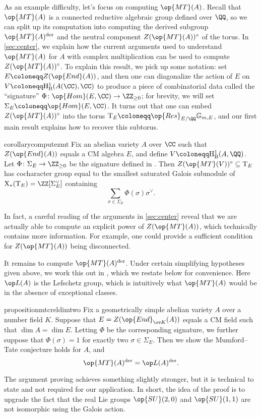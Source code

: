 \documentclass[openany]{book}
\begin{document}
As an example difficulty, let's focus on computing $\op{MT}(A)$. Recall that $\op{MT}(A)$ is a connected reductive algebraic group defined over $\QQ$, so we can split up its computation into computing the derived subgroup $\op{MT}(A)^{\mathrm{der}}$ and the neutral component $Z(\op{MT}(A))^\circ$ of the torus. In \cref{sec:center}, we explain how the current arguments used to understand $\op{MT}(A)$ for $A$ with complex multiplication can be used to compute $Z(\op{MT}(A))^\circ$. To explain this result, we pick up some notation: set $E\coloneqq Z(\op{End}(A))$, and then one can diagonalize the action of $E$ on $V\coloneqq\mathrm H^1_{\mathrm B}(A(\CC),\CC)$ to produce a piece of combinatorial data called the ``signature'' $\Phi\colon\op{Hom}(E,\CC)\to\ZZ_{\ge0}$; for brevity, we will set $\Sigma_E\coloneqq\op{Hom}(E,\CC)$. It turns out that one can embed $Z(\op{MT}(A))^\circ$ into the torus $\mathrm T_E\coloneqq\op{Res}_{E/\QQ}\mathbb G_{m,E}$, and our first main result explains how to recover this subtorus.
\begin{restatable*}{corollary}{computezmt} \label{cor:compute-z-mt}
	Fix an abelian variety $A$ over $\CC$ such that $Z(\op{End}(A))$ equals a CM algebra $E$, and define $V\coloneqq\mathrm H^1_{\mathrm B}(A,\QQ)$. Let $\Phi\colon\Sigma_E\to\ZZ_{\ge0}$ be the signature defined in . Then $Z(\op{MT}(V))^\circ\subseteq\mathrm T_E$ has cocharacter group equal to the smallest saturated Galois submodule of $\mathrm X_*(\mathrm T_E)=\ZZ[\Sigma_E^\lor]$ containing
	\[\sum_{\sigma\in\Sigma_E}\Phi(\sigma)\sigma^\lor.\]
\end{restatable*}
\begin{remark}
	In fact, a careful reading of the arguments in \cref{sec:center} reveal that we are actually able to compute an explicit power of $Z(\op{MT}(A))$, which technically contains more information. For example, one could provide a sufficient condition for $Z(\op{MT}(A))$ being disconnected.
\end{remark}
It remains to compute $\op{MT}(A)^{\mathrm{der}}$. Under certain simplifying hypotheses given above, we work this out in , which we restate below for convenience. Here $\op L(A)$ is the Lefschetz group, which is intuitively what $\op{MT}(A)$ would be in the absence of exceptional classes.
\begin{restatable*}{proposition}{mtcreldimtwo} \label{prop:mtc-reldim-2}
	Fix a geometrically simple abelian variety $A$ over a number field $K$. Suppose that $E=Z(\op{End}_{\ov K}(A))$ equals a CM field such that $\dim A=\dim E$. Letting $\Phi$ be the corresponding signature, we further suppose that $\Phi(\sigma)=1$ for exactly two $\sigma\in\Sigma_E$. Then we show the Mumford--Tate conjecture holds for $A$, and
	\[\op{MT}(A)^{\mathrm{der}}=\op L(A)^{\mathrm{der}}.\]
\end{restatable*}
\noindent The argument proving  achieves something slightly stronger, but it is technical to state and not required for our application. In short, the idea of the proof is to upgrade the fact that the real Lie groups $\op{SU}(2,0)$ and $\op{SU}(1,1)$ are not isomorphic using the Galois action.
\end{document}
